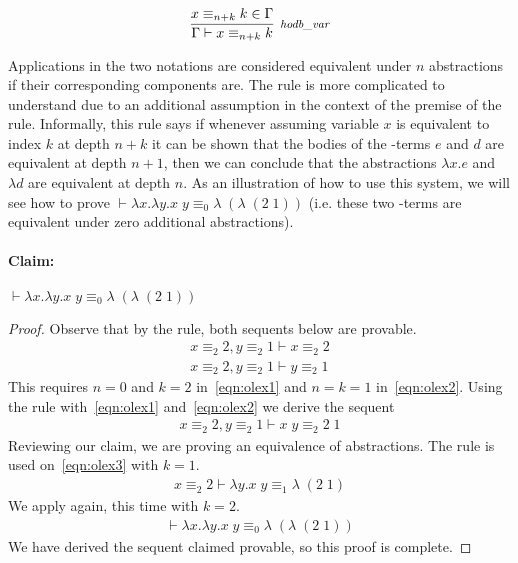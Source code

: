 \begin{expl}
$$
\inferH[\rl{hodb\_var}]{\dyncon{} \vdash x \equiv_{n+k} k}{x \equiv_{n+k} k \in \dyncon{}}
$$

Applications in the two notations are considered equivalent under $n$ abstractions if their corresponding components are. The rule  is more complicated to understand due to an additional assumption in the context of the premise of the rule. Informally, this rule says if whenever assuming variable $x$ is equivalent to index $k$ at depth $n + k$ it can be shown that the bodies of the \lambda-terms $e$ and $d$ are equivalent at depth $n + 1$, then we can conclude that the abstractions $\lambda x . e$ and $\lambda d$ are equivalent at depth $n$. As an illustration of how to use this system, we will see how to prove $\vdash \lambda x . \lambda y . x \; y \equiv_0 \lambda \; (\lambda \; (2 \; 1))$ (i.e. these two \lambda-terms are equivalent under zero additional abstractions).

\paragraph{Claim:} $\vdash \lambda x . \lambda y . x \; y \equiv_0 \lambda \; (\lambda \; (2 \; 1))$

\begin{proof}

Observe that by the  rule, both sequents below are provable.
\begin{align}
x \equiv_{2} 2 , y \equiv_{2} 1 \vdash x \equiv_{2} 2 \label{eqn:olex1} \\
x \equiv_{2} 2 , y \equiv_{2} 1 \vdash y \equiv_{2} 1 \label{eqn:olex2}
\end{align}
This requires $n=0$ and $k=2$ in~\eqref{eqn:olex1} and $n = k = 1$ in~\eqref{eqn:olex2}. Using the rule  with~\eqref{eqn:olex1} and~\eqref{eqn:olex2} we derive the sequent
\begin{align}
x \equiv_{2} 2 , y \equiv_{2} 1 \vdash x \; y \equiv_{2} 2 \; 1 \label{eqn:olex3}
\end{align}
Reviewing our claim, we are proving an equivalence of abstractions. The  rule is used on~\eqref{eqn:olex3} with $k = 1$.
\begin{align}
x \equiv_{2} 2 \vdash \lambda y . x \; y \equiv_{1} \lambda \; (2 \; 1)
\end{align}
We apply  again, this time with $k = 2$.
\begin{align}
\vdash \lambda x . \lambda y . x \; y \equiv_0 \lambda \; (\lambda \; (2 \; 1))
\end{align}
We have derived the sequent claimed provable, so this proof is complete.


\end{proof}
\end{expl}
